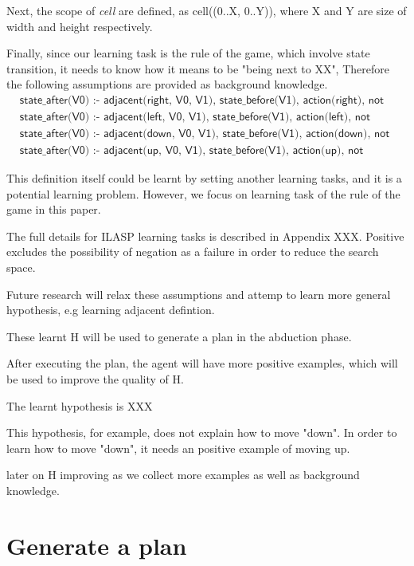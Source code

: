 Next, the scope of \textit{cell} are defined, as cell((0..X, 0..Y)), where X and Y are size of width and height respectively.

Finally, since our learning task is the rule of the game, which involve state transition, it needs to know how it means to be "being next to XX",
Therefore the following assumptions are provided as background knowledge. 
\begin{equation}
\begin{split}
&\textsf{state\_after(V0) :- adjacent(right, V0, V1), state\_before(V1), action(right), not wall(V0).}\\
&\textsf{state\_after(V0) :- adjacent(left, V0, V1), state\_before(V1), action(left), not wall(V0).}\\
&\textsf{state\_after(V0) :- adjacent(down, V0, V1), state\_before(V1), action(down), not wall(V0).}\\
&\textsf{state\_after(V0) :- adjacent(up, V0, V1), state\_before(V1), action(up), not wall(V0).}
\end{split}
\end{equation}

This definition itself could be learnt by setting another learning tasks, and it is a potential learning problem. 
However, we focus on learning task of the rule of the game in this paper. 

The full details for ILASP learning tasks is described in Appendix XXX.
Positive excludes the possibility of negation as a failure in order to reduce the search space.

Future research will relax these assumptions and attemp to learn more general hypothesis, 
e.g learning adjacent defintion. 

These learnt H will be used to generate a plan in the abduction phase. 

After executing the plan, the agent will have more positive examples, which will be used to improve the quality of H. 

The learnt hypothesis is XXX

This hypothesis, for example, does not explain how to move "down". In order to learn how to move "down", it needs an positive example of moving up. 

later on H improving as we collect more examples as well as background knowledge.

\section{Generate a plan}
\label{Generate a plan}

